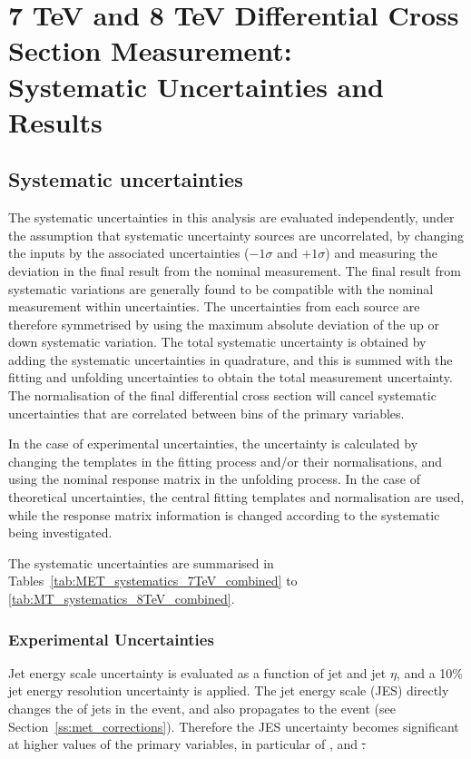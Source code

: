 \chapter{7 TeV and 8 TeV Differential Cross Section Measurement: \\ Systematic Uncertainties and Results}
\label{c:Differential_Cross_Section:systematics_and_results}

\section{Systematic uncertainties}
\label{s:systematic_uncertainties}
The systematic uncertainties in this analysis are evaluated independently, under the assumption that
systematic uncertainty sources are uncorrelated, by changing the inputs by the associated uncertainties
($-1\sigma$ and $+1\sigma$) and measuring the deviation in the final result from the nominal measurement. The
final result from systematic variations are generally found to be compatible with the nominal measurement within uncertainties. The
uncertainties from each source are therefore symmetrised by using the maximum absolute deviation of the up or
down systematic variation. The total systematic uncertainty is obtained by adding the systematic uncertainties
in quadrature, and this is summed with the fitting and unfolding uncertainties to obtain the total measurement
uncertainty. The normalisation of the final differential cross section will cancel systematic uncertainties
that are correlated between bins of the primary variables.

In the case of experimental uncertainties, the uncertainty is calculated by changing the templates in the
fitting process and/or their normalisations, and using the nominal \MADGRAPH response matrix in the unfolding
process. In the case of theoretical uncertainties, the central fitting templates and normalisation are used,
while the response matrix information is changed according to the systematic being investigated.

The systematic uncertainties are summarised in Tables~\ref{tab:MET_systematics_7TeV_combined} to
\ref{tab:MT_systematics_8TeV_combined}.

\subsection{Experimental Uncertainties}
\label{ss:experimental_uncertainties}

Jet energy scale uncertainty is evaluated as a function of jet \pt and jet $\eta$, and a 10\% jet energy
resolution uncertainty is applied. The jet energy scale (JES) directly changes the \pt of jets in
the event, and also propagates to the event \met (see
Section~\ref{ss:met_corrections}). Therefore the JES uncertainty becomes significant at higher
values of the primary variables, in particular of \met, \HT and \st.

